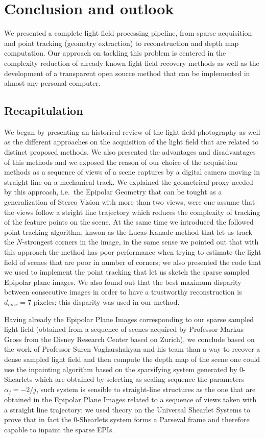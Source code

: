 \chapter{Conclusion and outlook}

We presented a complete light field processing pipeline, from sparse acquisition and point tracking (geometry extraction) to reconstruction and depth map computation. Our approach on tackling this problem is centered in the complexity reduction of already known light field recovery methods as well as the development of a transparent open source method that can be implemented in almost any personal computer.

\section{Recapitulation}

We began by presenting an historical review of the light field photography as well as the different approaches on the acquisition of the light field that are related to distinct proposed methods. We also presented the advantages and disadvantages of this methods and we exposed the reason of our choice of the acquisition methods as a sequence of views of a scene captures by a digital camera moving in straight line on a mechanical track. We explained the geometrical proxy needed by this approach, i.e.\ the Epipolar Geometry that can be tought as a generalization of Stereo Vision with more than two views, were one assume that the views follow a stright line trajectory which reduces the complexity of tracking of the feature points on the scene. At the same time we introduced the followed point tracking algorithm, knwon as the Lucas-Kanade method that let us track the $N$-strongest corners in the image, in the same sense we pointed out that with this approach the method has poor performance when trying to estimate the light field of scenes that are poor in number of corners; we also presented the code that we used to implement the point tracking that let us sketch the sparse sampled Epipolar plane images. We also found out that the best maximum disparity between consecutive images in order to have a trustworthy reconstruction is $d_{max}=7$ pixeles; this disparity was used in our method.

\bigskip 

Having already the Epipolar Plane Images corresponding to our sparse sampled light field (obtained from a sequence of scenes acquired by Professor Markus Gross from the Disney Research Center based on Zurich), we conclude based on the work of Professor Suren Vagharshakyan and his team \cite{LF-Shearlets} than a way to recover a dense sampled light field and then compute the depth map of the scene one could use the inpainting algorithm based on the sparsifying system generated by $0$-Shearlets which are obtained by selecting as scaling sequence the parameters $\alpha_j=-2/j$, such system is sensible to straight-line structures as the one that are obtained in the Epipolar Plane Images related to a sequence of views taken with a straight line trajectory; we used theory on the Universal Shearlet Systems to prove that in fact the $0$-Shearlets system forms a Parseval frame and therefore capable to inpaint the sparse EPIs. 

